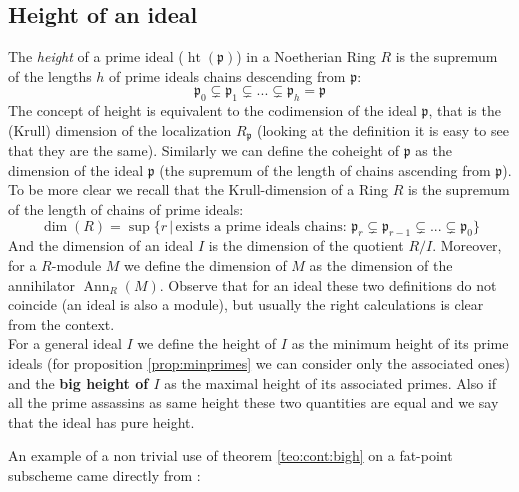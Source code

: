 \documentclass[notitlepage, a4]{book}
\theoremstyle{plain}
\theoremstyle{remark}
\theoremstyle{definition}
\newcommand{\p}{\mathfrak{p}}
\DeclareMathOperator{\Ann}{Ann}
\DeclareMathOperator{\hgt}{ht}
\newcounter{que}
\begin{document}
	\subsection{Height of an ideal}
	The \textit{height} of a prime ideal ($\hgt ( \p )$) in a Noetherian Ring $ R $ is the supremum of the lengths $ h $ of prime ideals chains descending from $ \p $:
	\begin{equation}\label{eq:chain}
		\p_0 \subsetneq \p_1 \subsetneq ... \subsetneq \p_{h} = \p
	\end{equation}
	The concept of height is equivalent to the codimension of the ideal $ \p $, that is the (Krull) dimension of the localization $ R_\p $ (looking at the definition it is easy to see that they are the same). Similarly we can define the coheight of $ \p $ as the dimension of the ideal $ \p $ (the supremum of the length of chains ascending from $ \p $). To be more clear we recall that the Krull-dimension of a Ring $ R $ is the supremum of the length of chains of prime ideals:
	\[ \dim (R) = \sup \{ r \,|\, \text{exists a prime ideals chains: } \p_r \subsetneq \p_{r-1} \subsetneq ... \subsetneq \p_0 \}\] 
	And the dimension of an ideal $ I $ is the dimension of the quotient $ R/I $. Moreover, for a $ R $-module $ M $ we define the dimension of $ M $ as the dimension of the annihilator $ \Ann_R(M) $. Observe that for an ideal these two definitions do not coincide (an ideal is also a module), but usually the right calculations is clear from the context. \\
	For a general ideal $ I $ we define the height of $ I $ as the minimum height of its prime ideals (for proposition \ref{prop:minprimes} we can consider only the associated ones) and the \textbf{big height of $ I $} as the maximal height of its associated primes. Also if all the prime assassins as same height these two quantities are equal and we say that the ideal has pure height.


%
%
	
	An example of a non trivial use of theorem \ref{teo:cont:bigh} on a fat-point subscheme came directly from \cite[2.3]{EinLazSmi01}:
	
\end{document}
